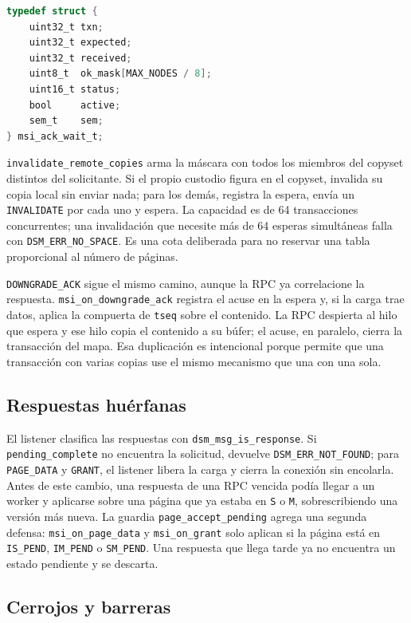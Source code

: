 \documentclass[11pt,spanish]{article}
\begin{document}
\begin{lstlisting}[language=C, caption={Espera de acuses por transacción.}, label={lst:ack}]
typedef struct {
    uint32_t txn;
    uint32_t expected;
    uint32_t received;
    uint8_t  ok_mask[MAX_NODES / 8];
    uint16_t status;
    bool     active;
    sem_t    sem;
} msi_ack_wait_t;
\end{lstlisting}

\texttt{invalidate\_remote\_copies} arma la máscara con todos los miembros del copyset distintos del solicitante. Si el propio custodio figura en el copyset, invalida su copia local sin enviar nada; para los demás, registra la espera, envía un \texttt{INVALIDATE} por cada uno y espera. La capacidad es de 64 transacciones concurrentes; una invalidación que necesite más de 64 esperas simultáneas falla con \texttt{DSM\_ERR\_NO\_SPACE}. Es una cota deliberada para no reservar una tabla proporcional al número de páginas.

\texttt{DOWNGRADE\_ACK} sigue el mismo camino, aunque la RPC ya correlacione la respuesta. \texttt{msi\_on\_downgrade\_ack} registra el acuse en la espera y, si la carga trae datos, aplica la compuerta de \texttt{tseq} sobre el contenido. La RPC despierta al hilo que espera y ese hilo copia el contenido a su búfer; el acuse, en paralelo, cierra la transacción del mapa. Esa duplicación es intencional porque permite que una transacción con varias copias use el mismo mecanismo que una con una sola.

\subsection{Respuestas huérfanas}

El listener clasifica las respuestas con \texttt{dsm\_msg\_is\_response}. Si \texttt{pending\_complete} no encuentra la solicitud, devuelve \texttt{DSM\_ERR\_NOT\_FOUND}; para \texttt{PAGE\_DATA} y \texttt{GRANT}, el listener libera la carga y cierra la conexión sin encolarla. Antes de este cambio, una respuesta de una RPC vencida podía llegar a un worker y aplicarse sobre una página que ya estaba en \texttt{S} o \texttt{M}, sobrescribiendo una versión más nueva. La guardia \texttt{page\_accept\_pending} agrega una segunda defensa: \texttt{msi\_on\_page\_data} y \texttt{msi\_on\_grant} solo aplican si la página está en \texttt{IS\_PEND}, \texttt{IM\_PEND} o \texttt{SM\_PEND}. Una respuesta que llega tarde ya no encuentra un estado pendiente y se descarta.

\subsection{Cerrojos y barreras}
\end{document}
